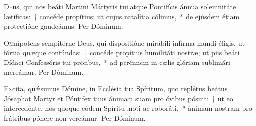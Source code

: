 \documentclass[vesperale_romanum]{subfiles}
\begin{document}

\label{112_7a_nov}



\admagnificat


\commemoration

\myrule
{}

\semiduplex


\oratio

\lettrine{D}{e}us, qui nos beáti Martini Mártyris tui atque Pontifícis ánnua sole\-mnitáte lætíficas:~† concéde propítius; ut cujus natalítia cólimus,~* de ejúsdem étiam prote\-ctióne gaudeámus. Per Dóminum.

\capitdeseq

\myrule

\newpage
{}

\semiduplex

\oratio

\lettrine{O}{m}nípotens sempitérne Deus, qui dispositióne mirábili infírma mundi éligis, ut fórtia quæque confúndas:~† concéde propítius humilitáti nostræ; ut piis beáti Dídaci Confessóris tui précibus,~* ad perénnem in cælis glóriam sublimári mereámur. Per Dóminum.

\vespsequentiscomm


\vespsequentiscomm

\myrule


\duplex

\oratio

\lettrine{E}{x}cita, quǽsumus Dómine, in Ecclésia tua Spíritum, quo replétus beátus Jósaphat Martyr et Póntifex tuus ánimam suam pro óvibus pósuit:~† ut eo intercedénte, nos quoque eódem Spíritu moti ac roboráti,~* ánimam nostram pro frátribus pónere non vereámur. Per Dóminum.
\end{document}
